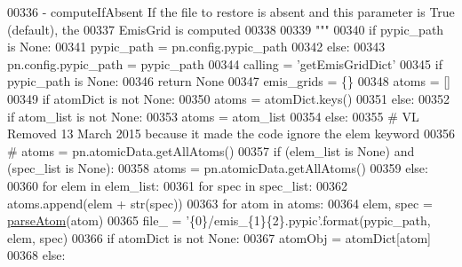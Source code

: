 \begin{DoxyCode}
00336 \textcolor{stringliteral}{        - computeIfAbsent   If the file to restore is absent and this parameter is True (default), the }
00337 \textcolor{stringliteral}{                            EmisGrid is computed}
00338 \textcolor{stringliteral}{            }
00339 \textcolor{stringliteral}{    """}
00340     \textcolor{keywordflow}{if} pypic\_path \textcolor{keywordflow}{is} \textcolor{keywordtype}{None}:
00341         pypic\_path = pn.config.pypic\_path
00342     \textcolor{keywordflow}{else}:
00343         pn.config.pypic\_path = pypic\_path
00344     calling = \textcolor{stringliteral}{'getEmisGridDict'}
00345     \textcolor{keywordflow}{if} pypic\_path \textcolor{keywordflow}{is} \textcolor{keywordtype}{None}:
00346         \textcolor{keywordflow}{return} \textcolor{keywordtype}{None}
00347     emis\_grids = \{\}
00348     atoms = []
00349     \textcolor{keywordflow}{if} atomDict \textcolor{keywordflow}{is} \textcolor{keywordflow}{not} \textcolor{keywordtype}{None}:
00350         atoms = atomDict.keys()
00351     \textcolor{keywordflow}{else}:
00352         \textcolor{keywordflow}{if} atom\_list \textcolor{keywordflow}{is} \textcolor{keywordflow}{not} \textcolor{keywordtype}{None}:
00353             atoms = atom\_list
00354         \textcolor{keywordflow}{else}:
00355 \textcolor{comment}{# VL Removed 13 March 2015 because it made the code ignore the elem keyword             }
00356 \textcolor{comment}{#            atoms = pn.atomicData.getAllAtoms()}
00357             \textcolor{keywordflow}{if} (elem\_list \textcolor{keywordflow}{is} \textcolor{keywordtype}{None}) \textcolor{keywordflow}{and} (spec\_list \textcolor{keywordflow}{is} \textcolor{keywordtype}{None}):
00358                 atoms = pn.atomicData.getAllAtoms()
00359             \textcolor{keywordflow}{else}:
00360                 \textcolor{keywordflow}{for} elem \textcolor{keywordflow}{in} elem\_list:
00361                     \textcolor{keywordflow}{for} spec \textcolor{keywordflow}{in} spec\_list:
00362                         atoms.append(elem + str(spec)) 
00363     \textcolor{keywordflow}{for} atom \textcolor{keywordflow}{in} atoms:
00364         elem, spec = \hyperlink{namespacepyneb_1_1utils_1_1misc_a8c069186002a3e73dd474958e35034d5}{parseAtom}(atom)
00365         file\_ = \textcolor{stringliteral}{'\{0\}/emis\_\{1\}\{2\}.pypic'}.format(pypic\_path, elem, spec)
00366         \textcolor{keywordflow}{if} atomDict \textcolor{keywordflow}{is} \textcolor{keywordflow}{not} \textcolor{keywordtype}{None}:
00367             atomObj = atomDict[atom]
00368         \textcolor{keywordflow}{else}:

\end{DoxyCode}
